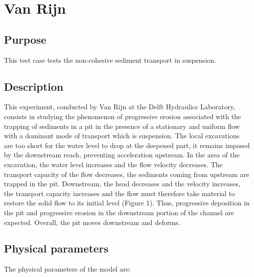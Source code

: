 \chapter{Van Rijn}\label{chapter:VR}

\section{Purpose}

This test case tests the non-cohesive sediment transport in suspension.

\section{Description}

This experiment, conducted by Van Rijn at the Delft Hydraulics 
Laboratory, consists in studying the phenomenon of progressive erosion
associated with the trapping of sediments in a pit in the presence of a
stationary and uniform flow with a dominant mode of transport which is 
suspension. The local excavations are too short for the water level to 
drop at the deepened part, it remains imposed by the downstream reach, 
preventing acceleration upstream. In the area of the excavation, the 
water level increases and the flow velocity decreases. The transport 
capacity of the flow decreases, the sediments coming from upstream are
trapped in the pit. Downstream, the head decreases and the velocity 
increases, the transport capacity increases and the flow must therefore
take material to restore the solid flow to its initial level
(Figure 1). Thus, progressive deposition in the pit and progressive 
erosion in the downstream portion of the channel are expected. 
Overall, the pit moves downstream and deforms. 

\section{Physical parameters}

The physical parameters of the model are:

